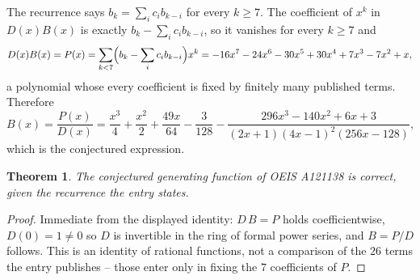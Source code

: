 \documentclass[11pt,a4paper]{article}
\theoremstyle{plain}
\newtheorem{theorem}{Theorem}
\theoremstyle{definition}
\begin{document}
The recurrence says $b_k=\sum_i c_ib_{k-i}$ for every $k\ge 7$. The coefficient of $x^k$ in
$D(x)B(x)$ is exactly $b_k-\sum_i c_ib_{k-i}$, so it vanishes for every $k\ge 7$ and
\[
  D(x)B(x)=P(x)=\sum_{k<7}\Bigl(b_k-\sum_i c_ib_{k-i}\Bigr)x^k
         =- 16 x^{7} - 24 x^{6} - 30 x^{5} + 30 x^{4} + 7 x^{3} - 7 x^{2} + x ,
\]
a polynomial whose every coefficient is fixed by finitely many published terms. Therefore
\[
  B(x)=\frac{P(x)}{D(x)}=\frac{x^{3}}{4} + \frac{x^{2}}{2} + \frac{49 x}{64} - \frac{3}{128} - \frac{296 x^{3} - 140 x^{2} + 6 x + 3}{\left(2 x + 1\right) \left(4 x - 1\right)^{2} \left(256 x - 128\right)} ,
\]
which is the conjectured expression.

\begin{theorem}
The conjectured generating function of OEIS A121138 is correct, given the recurrence the entry
states.
\end{theorem}

\begin{proof}
Immediate from the displayed identity: $D\,B=P$ holds coefficientwise, $D(0)=1\ne0$ so $D$ is
invertible in the ring of formal power series, and $B=P/D$ follows. This is an identity of
rational functions, not a comparison of the $26$ terms the entry publishes -- those
enter only in fixing the $7$ coefficients of $P$.
\end{proof}
\end{document}
